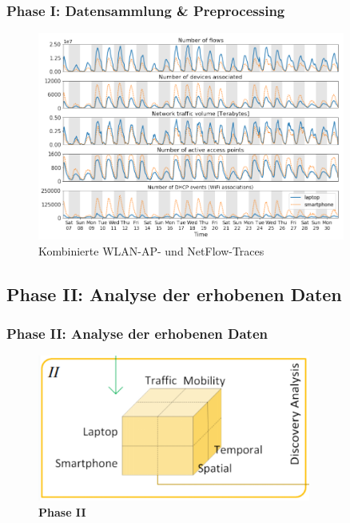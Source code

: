\documentclass{beamer}
\begin{document}
\begin{frame}
  \frametitle{Phase I: Datensammlung \& Preprocessing}
  \begin{figure}
    \centering
    \includegraphics[width=0.9\textwidth]{images/traces.png}
    \caption*{Kombinierte WLAN-AP- und NetFlow-Traces \cite{Alipour2018}}
  \end{figure}  
\end{frame}

\subsection{\textbf{Phase II}: Analyse der erhobenen Daten}

\begin{frame}
  \frametitle{Phase II: Analyse der erhobenen Daten}
  \begin{figure}
    \centering
    \includegraphics[width=0.8\textwidth]{images/phase2.png}
    \caption*{\textbf{Phase II} \cite{Alipour2018}}
  \end{figure}  
\end{frame}
\end{document}
